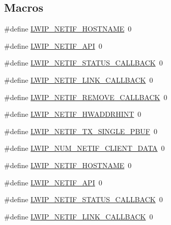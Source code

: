 \subsection*{Macros}
\begin{DoxyCompactItemize}
\item 
\#define \hyperlink{group__lwip__opts__netif_gaa714dbfa66822ec4c6111bdb8cf753c1}{L\+W\+I\+P\+\_\+\+N\+E\+T\+I\+F\+\_\+\+H\+O\+S\+T\+N\+A\+ME}~0
\item 
\#define \hyperlink{group__lwip__opts__netif_gadd45fb65f2d0e6de5a0d14ff9e101b77}{L\+W\+I\+P\+\_\+\+N\+E\+T\+I\+F\+\_\+\+A\+PI}~0
\item 
\#define \hyperlink{group__lwip__opts__netif_gaffb97d89516c38d3fcb9e44e5d707f36}{L\+W\+I\+P\+\_\+\+N\+E\+T\+I\+F\+\_\+\+S\+T\+A\+T\+U\+S\+\_\+\+C\+A\+L\+L\+B\+A\+CK}~0
\item 
\#define \hyperlink{group__lwip__opts__netif_ga1a446932dd927cc4136ba654c13bb97b}{L\+W\+I\+P\+\_\+\+N\+E\+T\+I\+F\+\_\+\+L\+I\+N\+K\+\_\+\+C\+A\+L\+L\+B\+A\+CK}~0
\item 
\#define \hyperlink{group__lwip__opts__netif_ga9c942c2e9655b06d4f73c630d30f60bf}{L\+W\+I\+P\+\_\+\+N\+E\+T\+I\+F\+\_\+\+R\+E\+M\+O\+V\+E\+\_\+\+C\+A\+L\+L\+B\+A\+CK}~0
\item 
\#define \hyperlink{group__lwip__opts__netif_gad1d5e878d94b56ba687cef69be936ad9}{L\+W\+I\+P\+\_\+\+N\+E\+T\+I\+F\+\_\+\+H\+W\+A\+D\+D\+R\+H\+I\+NT}~0
\item 
\#define \hyperlink{group__lwip__opts__netif_gabafb9f64a80e51b56c0abbcfc1f7e04e}{L\+W\+I\+P\+\_\+\+N\+E\+T\+I\+F\+\_\+\+T\+X\+\_\+\+S\+I\+N\+G\+L\+E\+\_\+\+P\+B\+UF}~0
\item 
\#define \hyperlink{group__lwip__opts__netif_ga94a35212616f9a9aae5c98741612b936}{L\+W\+I\+P\+\_\+\+N\+U\+M\+\_\+\+N\+E\+T\+I\+F\+\_\+\+C\+L\+I\+E\+N\+T\+\_\+\+D\+A\+TA}~0
\item 
\#define \hyperlink{group__lwip__opts__netif_gaa714dbfa66822ec4c6111bdb8cf753c1}{L\+W\+I\+P\+\_\+\+N\+E\+T\+I\+F\+\_\+\+H\+O\+S\+T\+N\+A\+ME}~0
\item 
\#define \hyperlink{group__lwip__opts__netif_gadd45fb65f2d0e6de5a0d14ff9e101b77}{L\+W\+I\+P\+\_\+\+N\+E\+T\+I\+F\+\_\+\+A\+PI}~0
\item 
\#define \hyperlink{group__lwip__opts__netif_gaffb97d89516c38d3fcb9e44e5d707f36}{L\+W\+I\+P\+\_\+\+N\+E\+T\+I\+F\+\_\+\+S\+T\+A\+T\+U\+S\+\_\+\+C\+A\+L\+L\+B\+A\+CK}~0
\item 
\#define \hyperlink{group__lwip__opts__netif_ga1a446932dd927cc4136ba654c13bb97b}{L\+W\+I\+P\+\_\+\+N\+E\+T\+I\+F\+\_\+\+L\+I\+N\+K\+\_\+\+C\+A\+L\+L\+B\+A\+CK}~0

\end{DoxyCompactItemize}
